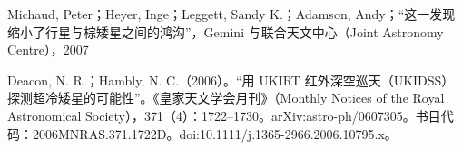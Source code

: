 Michaud, Peter；Heyer, Inge；Leggett, Sandy K.；Adamson, Andy；“这一发现缩小了行星与棕矮星之间的鸿沟”，Gemini 与联合天文中心（Joint Astronomy Centre），2007

Deacon, N. R.；Hambly, N. C.（2006）。“用 UKIRT 红外深空巡天（UKIDSS）探测超冷矮星的可能性”。《皇家天文学会月刊》（Monthly Notices of the Royal Astronomical Society），371（4）：1722–1730。arXiv:astro-ph/0607305。书目代码：2006MNRAS.371.1722D。doi:10.1111/j.1365-2966.2006.10795.x。
